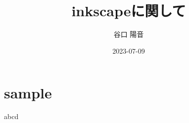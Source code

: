 \documentclass{ltjsarticle}
\begin{document}
\title{inkscapeに関して}
\author{谷口 陽音}
\date{2023-07-09}
\maketitle

\section{sample}
abcd
\end{document}
